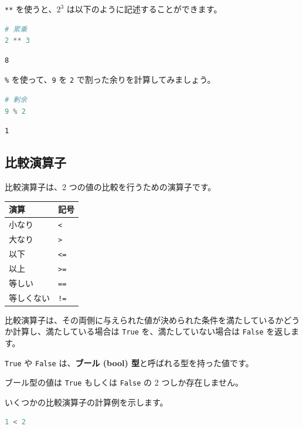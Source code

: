 \texttt{**} を使うと、$2^3$ は以下のように記述することができます。


\begin{lstlisting}[style=codecell,language=Python]
# 累乗
2 ** 3
\end{lstlisting}

\begin{lstlisting}[style=outputcell]
8
\end{lstlisting}

\texttt{\%} を使って、\texttt{9} を \texttt{2} で割った余りを計算してみましょう。


\begin{lstlisting}[style=codecell,language=Python]
# 剰余
9 % 2
\end{lstlisting}

\begin{lstlisting}[style=outputcell]
1
\end{lstlisting}

\subsection{比較演算子}


比較演算子は、2 つの値の比較を行うための演算子です。


\begin{center}
\begin{tabular}{|l|l|}
\hline
演算 & 記号 \\
\hline
小なり & \texttt{<} \\
大なり & \texttt{>} \\
以下 & \texttt{<=} \\
以上 & \texttt{>=} \\
等しい & \texttt{==} \\
等しくない & \texttt{!=} \\
\hline
\end{tabular}
\end{center}


比較演算子は、その両側に与えられた値が決められた条件を満たしているかどうか計算し、満たしている場合は \texttt{True} を、満たしていない場合は \texttt{False} を返します。

\texttt{True} や \texttt{False} は、\textbf{ブール (bool) 型}と呼ばれる型を持った値です。

ブール型の値は \texttt{True} もしくは \texttt{False} の 2 つしか存在しません。


いくつかの比較演算子の計算例を示します。


\begin{lstlisting}[style=codecell,language=Python]
1 < 2
\end{lstlisting}

